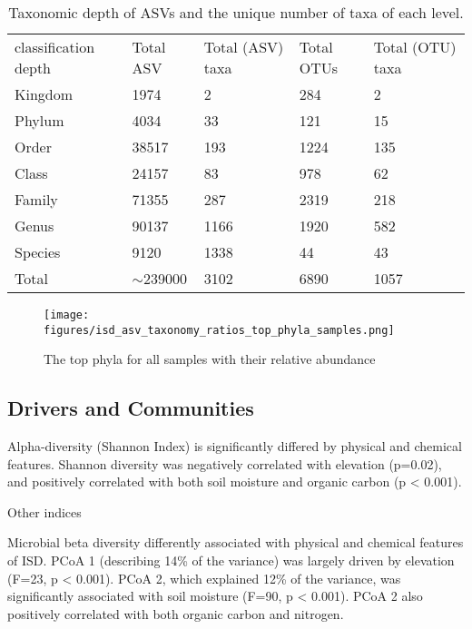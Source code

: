 \begin{table}[]
    \caption{Taxonomic depth of ASVs and the unique number of taxa of each level.\label{table:asv_taxonomy}}%
\begin{tabular}{@{}lllll@{}}
classification depth & Total ASV    & Total (ASV) taxa & Total OTUs & Total (OTU) taxa\\
Kingdom              & 1974         & 2                & 284        & 2               \\
Phylum               & 4034         & 33               & 121        & 15              \\
Order                & 38517        & 193              & 1224       & 135             \\
Class                & 24157        & 83               & 978        & 62              \\
Family               & 71355        & 287              & 2319       & 218             \\
Genus                & 90137        & 1166             & 1920       & 582             \\
Species              & 9120         & 1338             & 44         & 43              \\
Total                & $\sim$239000 & 3102             & 6890       & 1057            
\end{tabular}
\label{table:asv_taxonomy}
\end{table}

\begin{figure}[h]
      \centering
      \texttt{[image: figures/isd\_asv\_taxonomy\_ratios\_top\_phyla\_samples.png]}
      \caption[Top phyla of each samples]{The top phyla for all samples with their relative abundance}
      \label{fig:isd_top_phyla_samples}
\end{figure}
   

\subsection{Drivers and Communities}\label{communities}
Alpha-diversity (Shannon Index) is significantly differed by physical and chemical features.
Shannon diversity was negatively correlated with elevation (p=0.02), and
positively correlated with both soil moisture and organic carbon (p < 0.001).

Other indices 


Microbial beta diversity differently associated with physical and chemical
features of ISD. PCoA 1 (describing 14\% of the variance) was largely driven by
elevation (F=23, p < 0.001). PCoA 2, which explained 12\% of the variance,
was significantly associated with soil moisture (F=90, p < 0.001).
PCoA 2 also positively correlated with both organic carbon and nitrogen.

